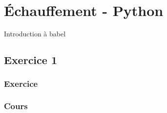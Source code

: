 \section{Échauffement - Python}
\label{sec:echauffement}

Introduction à babel

\subsection{Exercice 1}
\label{subsec:exercice-1}

\subsubsection{Exercice}
\label{subsec:exercice-1-exercice}

\subsubsection{Cours}
\label{subsec:exercice-1-cours}
